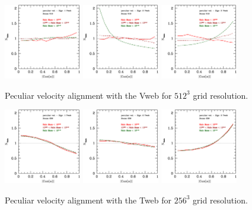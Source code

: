 \documentclass[usenatbib]{mn2e}
\begin{document}
\begin{figure}
\includegraphics[width=0.30\textwidth]{../plot2/Vel/512_vel_V1.ps}
\includegraphics[width=0.30\textwidth]{../plot2/Vel/512_vel_V2.ps}
\includegraphics[width=0.30\textwidth]{../plot2/Vel/512_vel_V3.ps}
\caption{Peculiar velocity alignment with the Vweb for $512^3$ grid resolution.}
\end{figure}


\begin{figure}
\includegraphics[width=0.30\textwidth]{../plot2/Vel/256_vel_T1.ps}
\includegraphics[width=0.30\textwidth]{../plot2/Vel/256_vel_T2.ps}
\includegraphics[width=0.30\textwidth]{../plot2/Vel/256_vel_T3.ps}
\caption{Peculiar velocity alignment with the Tweb for $256^3$ grid resolution.}
\end{figure}
\end{document}
